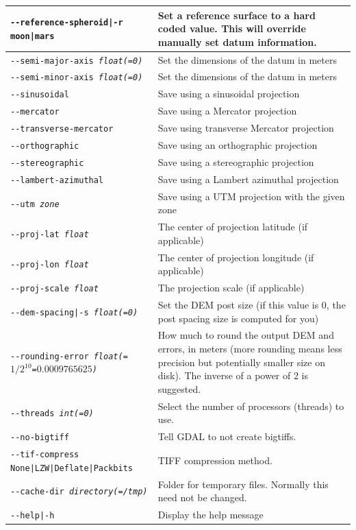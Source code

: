\begin{longtable}{|p{8cm}|p{9cm}|}
\texttt{-\/-reference-spheroid|-r moon|mars} & Set a reference surface to a hard coded value. This will override manually set datum information. \\ \hline
\texttt{-\/-semi-major-axis \textit{float(=0)}} & Set the dimensions of the datum in meters\\ \hline
\texttt{-\/-semi-minor-axis \textit{float(=0)}} & Set the dimensions of the datum in meters\\ \hline
\texttt{-\/-sinusoidal} & Save using a sinusoidal projection \\ \hline
\texttt{-\/-mercator} & Save using a Mercator projection \\ \hline
\texttt{-\/-transverse-mercator} & Save using transverse Mercator projection \\ \hline
\texttt{-\/-orthographic} & Save using an orthographic projection \\ \hline
\texttt{-\/-stereographic} & Save using a stereographic projection \\ \hline
\texttt{-\/-lambert-azimuthal} & Save using a Lambert azimuthal projection \\ \hline
\texttt{-\/-utm \textit{zone}} & Save using a UTM projection with the given zone \\ \hline
\texttt{-\/-proj-lat \textit{float}} & The center of projection latitude (if applicable) \\ \hline
\texttt{-\/-proj-lon \textit{float}} & The center of projection longitude (if applicable) \\ \hline
\texttt{-\/-proj-scale \textit{float}} & The projection scale (if applicable) \\ \hline
\texttt{-\/-dem-spacing|-s \textit{float(=0)}} & Set the \ac{DEM} post size (if this value is 0, the post spacing size is computed for you) \\ \hline
\texttt{-\/-rounding-error \textit{float(=$1/2^{10}$=$0.0009765625$)}} & How much to round the output DEM and errors, in meters (more rounding means less precision but potentially smaller size on disk). The inverse of a power of 2 is suggested. \\ \hline
\texttt{-\/-threads \textit{int(=0)}} & Select the number of processors (threads) to use.\\ \hline
\texttt{-\/-no-bigtiff} & Tell GDAL to not create bigtiffs.\\ \hline
\texttt{-\/-tif-compress None|LZW|Deflate|Packbits} & TIFF compression method.\\ \hline
\texttt{-\/-cache-dir \textit{directory(=/tmp)}} & Folder for temporary files. Normally this need not be changed.\\ \hline
\hline
\texttt{-\/-help|-h} & Display the help message \\ \hline
\end{longtable}


